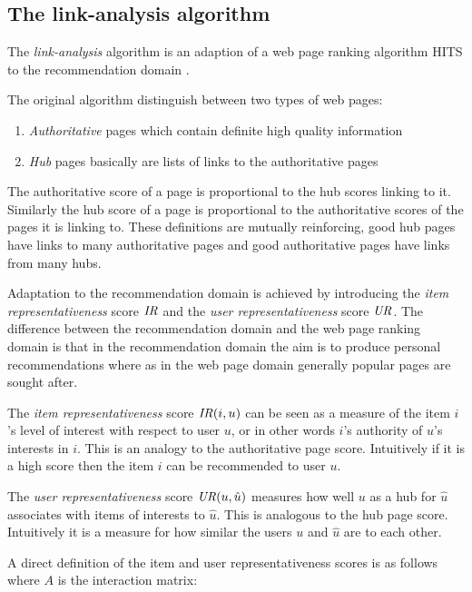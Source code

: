 \subsection{The link-analysis algorithm}\label{sec:background:linkanalysis}

The \textit{link-analysis} algorithm is an adaption of a web page ranking algorithm HITS \cite{kleinberg1999authoritative} to the recommendation domain \cite{huang2004link, huang2007comparison}.

The original algorithm distinguish between two types of web pages:

\begin{enumerate}
    \item \textit{Authoritative} pages which contain definite high quality information
    \item \textit{Hub} pages basically are lists of links to the authoritative pages
\end{enumerate}

The authoritative score of a page is proportional to the hub scores linking to it. Similarly the hub score of a page is proportional to the authoritative scores of the pages it is linking to. These definitions are mutually reinforcing, good hub pages have links to many authoritative pages and good authoritative pages have links from many hubs.

Adaptation to the recommendation domain is achieved by introducing the \textit{item representativeness} score $\mathit{IR}$ and the \textit{user representativeness} score $\mathit{UR}$. The difference between the recommendation domain and the web page ranking domain is that in the recommendation domain the aim is to produce personal recommendations where as in the web page domain generally popular pages are sought after.

The \textit{item representativeness} score $\mathit{IR}(i, u)$ can be seen as a measure of the item $i$'s level of interest with respect to user $u$, or in other words $i$'s authority of $u$'s interests in $i$. This is an analogy to the authoritative page score. Intuitively if it is a high score then the item $i$ can be recommended to user $u$.

The \textit{user representativeness} score $\mathit{UR}(u, \hat{u})$ measures how well $u$ as a hub for $\hat{u}$ associates with items of interests to $\hat{u}$. This is analogous to the hub page score. Intuitively it is a measure for how similar the users $u$ and $\hat{u}$ are to each other.

A direct definition of the item and user representativeness scores is as follows where $A$ is the interaction matrix:

